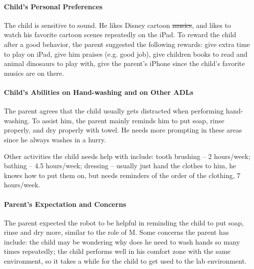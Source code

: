\documentclass{ut-thesis}
\providecommand{\DIFaddtex}[1]{{\protect\color{blue}\uwave{#1}}} %
\providecommand{\DIFdeltex}[1]{{\protect\color{red}\sout{#1}}}                      %
\providecommand{\DIFaddbegin}{} %
\providecommand{\DIFaddend}{} %
\providecommand{\DIFdelbegin}{} %
\providecommand{\DIFdelend}{} %
\providecommand{\DIFadd}[1]{\texorpdfstring{\DIFaddtex{#1}}{#1}} %
\providecommand{\DIFdel}[1]{\texorpdfstring{\DIFdeltex{#1}}{}} %
\begin{document}
\paragraph{Child's Personal Preferences}
The child is sensitive to sound.  He likes Disney cartoon \DIFdelbegin \DIFdel{musics}\DIFdelend \DIFaddbegin \DIFadd{music}\DIFaddend , and likes to watch his favorite cartoon scenes repeatedly on the iPad.  To reward the child after a good behavior, the parent suggested the following rewards: give extra time to play on iPad, give him praises (e.g. good job), give children books to read and animal dinosaurs to play with, give the parent's iPhone since the child's favorite musics are on there.

\paragraph{Child's Abilities on Hand-washing and on Other ADLs}
The parent agrees that the child usually gets distracted when performing hand-washing.  To assist him, the parent mainly reminds him to put soap, rinse properly, and dry properly with towel.  He needs more prompting in these areas since he always washes in a hurry.

Other \DIFaddbegin \DIFadd{everyday }\DIFaddend activities the child needs help with include:  tooth brushing -- 2 hours/week; bathing -- 4.5 hours/week; dressing -- usually just hand the clothes to him, he knows how to put them on, but needs reminders of the order of the clothing, 7 hours/week.

\paragraph{Parent's Expectation and Concerns}
The parent expected the robot to be helpful in reminding the child to put soap, rinse and dry more, similar to the role of M.  Some concerns the parent has include: the child may be wondering why does he need to wash hands so many times repeatedly; the child performs well in his comfort zone with the same environment, so it takes a while for the child to get used to the lab environment.
\end{document}
